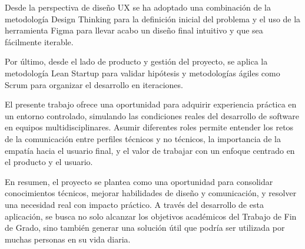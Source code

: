 Desde la perspectiva de diseño UX se ha adoptado una combinación de la metodología Design Thinking para la definición inicial del problema y el uso de la herramienta Figma para llevar acabo un diseño final intuitivo y que sea fácilmente iterable.

Por último, desde el lado de producto y gestión del proyecto, se aplica la metodología Lean Startup para validar hipótesis y metodologías ágiles como Scrum para organizar el desarrollo en iteraciones.

El presente trabajo ofrece una oportunidad para adquirir experiencia práctica en un entorno controlado, simulando las condiciones reales del desarrollo de software en equipos multidisciplinares. Asumir diferentes roles permite entender los retos de la comunicación entre perfiles técnicos y no técnicos, la importancia de la empatía hacia el usuario final, y el valor de trabajar con un enfoque centrado en el producto y el usuario.

En resumen, el proyecto se plantea como una oportunidad para consolidar conocimientos técnicos, mejorar habilidades de diseño y comunicación, y resolver una necesidad real con impacto práctico. A través del desarrollo de esta aplicación, se busca no solo alcanzar los objetivos académicos del Trabajo de Fin de Grado, sino también generar una solución útil que podría ser utilizada por muchas personas en su vida diaria.
